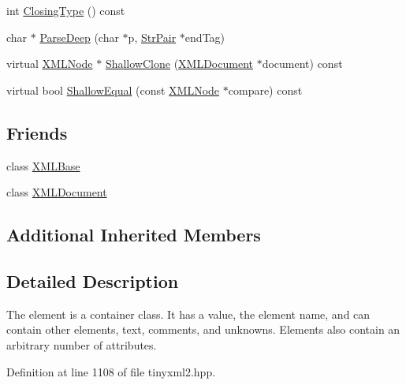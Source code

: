 \begin{DoxyCompactItemize}
int \hyperlink{classtinyxml2_1_1_x_m_l_element_a2e3d9f938307a05963d7c4b8cd55754e}{Closing\-Type} () const 
\item 
char $\ast$ \hyperlink{classtinyxml2_1_1_x_m_l_element_aaafdd2a5618abe80a2c1839ad3ccd492}{Parse\-Deep} (char $\ast$p, \hyperlink{classtinyxml2_1_1_str_pair}{Str\-Pair} $\ast$end\-Tag)
\item 
virtual \hyperlink{classtinyxml2_1_1_x_m_l_node}{X\-M\-L\-Node} $\ast$ \hyperlink{classtinyxml2_1_1_x_m_l_element_a85d85e32c18863fff1eeed53ae1ce23d}{Shallow\-Clone} (\hyperlink{classtinyxml2_1_1_x_m_l_document}{X\-M\-L\-Document} $\ast$document) const 
\item 
virtual bool \hyperlink{classtinyxml2_1_1_x_m_l_element_a25d51a2aad92625c78441457d58c85bc}{Shallow\-Equal} (const \hyperlink{classtinyxml2_1_1_x_m_l_node}{X\-M\-L\-Node} $\ast$compare) const 
\end{DoxyCompactItemize}
\subsection*{Friends}
\begin{DoxyCompactItemize}
\item 
class \hyperlink{classtinyxml2_1_1_x_m_l_element_a449202cfc89e7ae5c2f81995476f9ec1}{X\-M\-L\-Base}
\item 
class \hyperlink{classtinyxml2_1_1_x_m_l_element_a4eee3bda60c60a30e4e8cd4ea91c4c6e}{X\-M\-L\-Document}
\end{DoxyCompactItemize}
\subsection*{Additional Inherited Members}


\subsection{Detailed Description}
The element is a container class. It has a value, the element name, and can contain other elements, text, comments, and unknowns. Elements also contain an arbitrary number of attributes. 

Definition at line 1108 of file tinyxml2.\-hpp.



